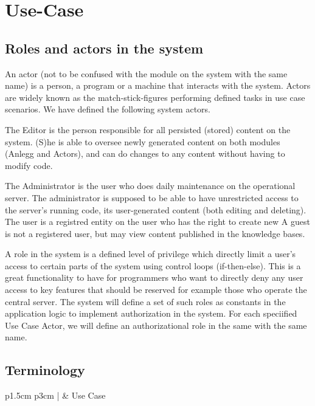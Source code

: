 \chapter{Use-Case}

\section{Roles and actors in the system}

An actor (not to be confused with the module on the system with the same name) is a person, a program or a machine that interacts with the system. Actors are widely known as the match-stick-figures performing defined tasks in use case scenarios. We have defined the following system actors. \par

The Editor is the person responsible for all persisted (stored) content on the system. (S)he is able to oversee newly generated content on both modules (Anlegg and Actors), and can do changes to any content without having to modify code.\par
The Administrator is the user who does daily maintenance on the operational server. The administrator is supposed to be able to have unrestricted access to the server's running code, its user-generated content (both editing and deleting).
The user is a registred entity on the user who has the right to create new 
A guest is not a registered user, but may view content published in the knowledge bases.

A role in the system is a defined level of privilege which directly limit a user's access to certain parts of the system using control loops (if-then-else). This is a great functionality to have for programmers who want to directly deny any user access to key features that should be reserved for example those who operate the central server. The system will define a set of such roles as constants in the application logic to implement authorization in the system. For each speciified Use Case Actor, we will define an authorizational role in the same with the same name.

\newpage
\section{Terminology}
\begin{tabular}{p{1.5cm} p{3cm} | }
	\hline
	 & Use Case\\
	\hline
\end{tabular}
\\[1cm]
\newpage
